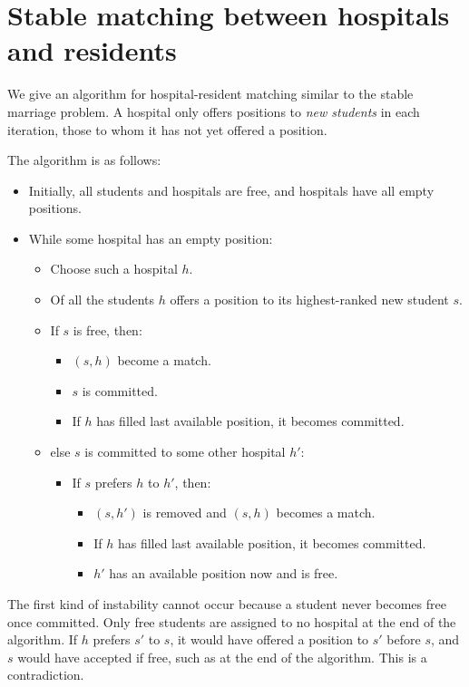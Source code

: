 \documentclass[12pt]{article}
\begin{document}
\setcounter{section}{0}
\section{Stable matching between hospitals and residents}

We give an algorithm for hospital-resident matching similar to the stable
marriage problem.
A hospital only offers positions to \textit{new students} in each
iteration, those to whom it has
not yet offered a position.

The algorithm is as follows:

\begin{itemize}
\item
Initially, all students and hospitals are free, and hospitals have all
empty positions.
\item While some hospital has an empty position:
\begin{itemize}
\item Choose such a hospital $h$.
\item Of all the students $h$ offers a position to its highest-ranked
      new student $s$.
\item If $s$ is free, then:
\begin{itemize}
\item $(s,h)$ become a match.
\item $s$ is committed.
\item If $h$ has filled last available position, it becomes committed.
\end{itemize}
\item else $s$ is committed to some other hospital $h'$:
\begin{itemize}
\item If $s$ prefers $h$ to $h'$, then:
\begin{itemize}
\item $(s,h')$ is removed and $(s,h)$ becomes a match.
\item If $h$ has filled last available position, it becomes committed.
\item $h'$ has an available position now and is free.
\end{itemize}
\end{itemize}
\end{itemize}
\end{itemize}

The first kind of instability cannot occur because a student never becomes
free once committed. Only free students are assigned to no hospital at
the end of the algorithm. If $h$ prefers $s'$ to $s$, it would have
offered a position to $s'$ before $s$, and $s$ would have accepted if free,
such as at the end of the algorithm. This is a contradiction.
\end{document}
